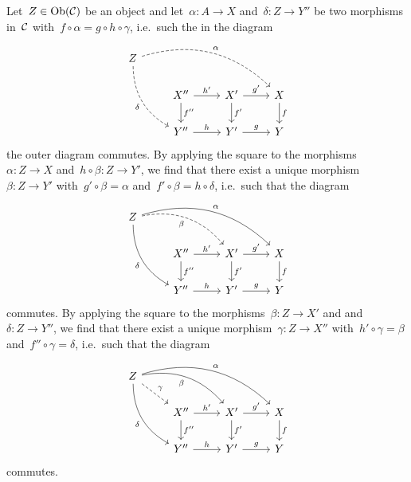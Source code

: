 \section{}





\subsection{}

Let~$Z \in \operatorname{Ob}(\mathcal{C})$ be an object and let~$\alpha \colon A \to X$ and~$\delta \colon Z \to Y''$ be two morphisms in~$\mathcal{C}$ with~$f \circ \alpha = g \circ h \circ \gamma$, i.e.\ such the in the diagram
\[
  \begin{tikzcd}
      Z
      \arrow[dashed,bend left]{drrr}[above right]{\alpha}
      \arrow[dashed,bend right]{ddr}[below left]{\delta}
    & {}
    & {}
    & {}
    \\
      {}
    & X''
      \arrow{r}[above]{h'}
      \arrow{d}[right]{f''}
    & X'
      \arrow{r}[above]{g'}
      \arrow{d}[right]{f'}
    & X
      \arrow{d}[right]{f}
    \\
      {}
    & Y''
      \arrow{r}[above]{h}
    & Y'
      \arrow{r}[above]{g}
    & Y
  \end{tikzcd}
\]
the outer diagram commutes.
By applying the  {\pb} square to the morphisms~$\alpha \colon Z \to X$ and~$h \circ \beta \colon Z \to Y'$, we find that there exist a unique morphism~$\beta \colon Z \to Y'$ with~$g' \circ \beta = \alpha$ and~$f' \circ \beta = h \circ \delta$, i.e.\ such that the diagram
\[
  \begin{tikzcd}
      Z
      \arrow[bend left]{drrr}[above right]{\alpha}
      \arrow[dashed, bend left]{drr}[below left]{\beta}
      \arrow[bend right]{ddr}[below left]{\delta}
    & {}
    & {}
    & {}
    \\
      {}
    & X''
      \arrow{r}[above]{h'}
      \arrow{d}[right]{f''}
    & X'
      \arrow{r}[above]{g'}
      \arrow{d}[right]{f'}
    & X
      \arrow{d}[right]{f}
    \\
      {}
    & Y''
      \arrow{r}[above]{h}
    & Y'
      \arrow{r}[above]{g}
    & Y
  \end{tikzcd}
\]
commutes.
By applying the  {\pb} square to the morphisms~$\beta \colon Z \to X'$ and and~$\delta \colon Z \to Y''$, we find that there exist a unique morphism~$\gamma \colon Z \to X''$ with~$h' \circ \gamma = \beta$ and~$f'' \circ \gamma = \delta$, i.e.\ such that the diagram
\[
  \begin{tikzcd}
      Z
      \arrow[bend left]{drrr}[above right]{\alpha}
      \arrow[bend left]{drr}[below left]{\beta}
      \arrow[dashed]{dr}[above right]{\gamma}
      \arrow[bend right]{ddr}[below left]{\delta}
    & {}
    & {}
    & {}
    \\
      {}
    & X''
      \arrow{r}[above]{h'}
      \arrow{d}[right]{f''}
    & X'
      \arrow{r}[above]{g'}
      \arrow{d}[right]{f'}
    & X
      \arrow{d}[right]{f}
    \\
      {}
    & Y''
      \arrow{r}[above]{h}
    & Y'
      \arrow{r}[above]{g}
    & Y
  \end{tikzcd}
\]
commutes.

